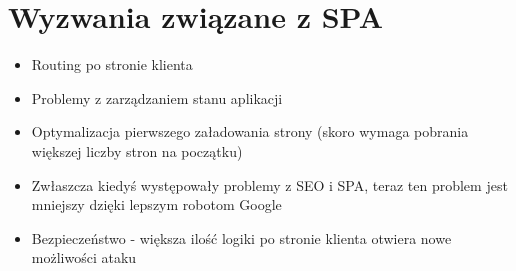 \documentclass[a4paper,12pt]{article}
\begin{document}
\section{Wyzwania związane z SPA}

\begin{itemize}
    \item Routing po stronie klienta
    \item Problemy z zarządzaniem stanu aplikacji
    \item Optymalizacja pierwszego załadowania strony (skoro wymaga pobrania większej liczby stron na początku)
    \item Zwłaszcza kiedyś występowały problemy z SEO i SPA, teraz ten problem jest mniejszy dzięki lepszym robotom Google
    \item Bezpieczeństwo - większa ilość logiki po stronie klienta otwiera nowe możliwości ataku
\end{itemize}
\end{document}

